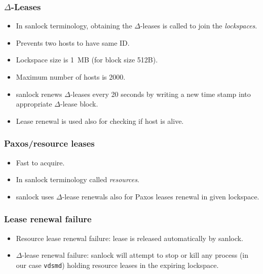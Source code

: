 \documentclass[10pt,utf8]{beamer}
\begin{document}
\begin{frame}
    \frametitle{$\Delta$-Leases}
  \begin{itemize}
    \item In sanlock terminology, obtaining the $\Delta$-leases is called to join the \textit{lockspaces}.
    \item Prevents two hosts to have same ID.
    \item Lockspace size is 1~MB (for block size 512B).
    \item Maximum number of hosts is 2000.
    \item sanlock renews $\Delta$-leases every 20 seconds by writing a new time stamp into appropriate $\Delta$-lease block.
    \item Lease renewal is used also for checking if host is alive.
  \end{itemize}
\end{frame}

\begin{frame}
  \frametitle{Paxos/resource leases}
  \begin{itemize}
    \item Fast to acquire.
    \item In sanlock terminology called \textit{resources}.
    \item sanlock uses $\Delta$-lease renewals also for Paxos leases renewal in given lockspace.
  \end{itemize}
\end{frame}

\begin{frame}
  \frametitle{Lease renewal failure}
  \begin{itemize}
    \item Resource lease renewal failure: lease is released automatically by sanlock.
    \item $\Delta$-lease renewal failure: sanlock will attempt to stop or kill any process (in our case \texttt{vdsmd}) holding resource leases in the expiring lockspace.
  \end{itemize}
\end{frame}
\end{document}
